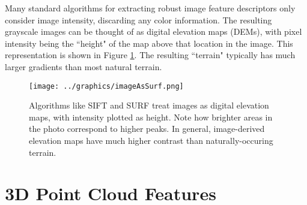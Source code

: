 Many standard algorithms for extracting robust image feature descriptors only consider image intensity, discarding any color information. The resulting grayscale images can be thought of as digital elevation maps (DEMs), with pixel intensity being the ``height" of the map above that location in the image. This representation is shown in Figure \ref{fig:imAsSurf}. The resulting ``terrain" typically has much larger gradients than most natural terrain.

\begin{figure}[htbp]
   \centering
   \texttt{[image: ../graphics/imageAsSurf.png]} %
   \caption{Algorithms like SIFT and SURF treat images as digital elevation maps, with intensity plotted as height. Note how brighter areas in the photo correspond to higher peaks. In general, image-derived elevation maps have much higher contrast than naturally-occuring terrain.}
   \label{fig:imAsSurf}
\end{figure}
 
 \section{3D Point Cloud Features}
 